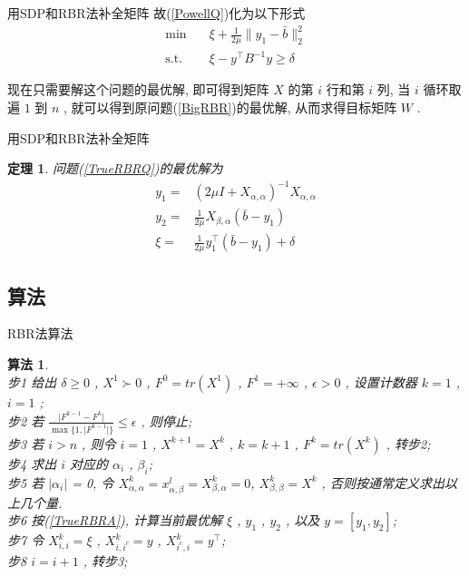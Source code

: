 \documentclass[slidestop, compress, mathserif, UTF8]{beamer}
\newtheorem{theo}{\bf \textcolor[rgb]{0.8,0,0}{定理}}[section]          %
\newtheorem{algo}{\bf \textcolor[rgb]{0.8,0,0}{算法}}
\numberwithin{equation}{section}                                        %
\begin{document}
			\begin{frame}[t]{用SDP和RBR法补全矩阵}
				故(\ref{PowellQ})化为以下形式
				\begin{equation}
					\begin{split}\label{TrueRBRQ}
						\min \quad
							& \xi + \frac{1}{2\mu} \lVert{y_1 - \bar{b}}\rVert^2_2\\
						\text{s.t.} \quad
							& \xi - y^\top B^{-1} y \geq \delta
					\end{split}
				\end{equation}

				现在只需要解这个问题的最优解, 即可得到矩阵 $X$ 的第 $i$ 行和第 $i$ 列, 当 $i$ 循环取遍 $1$ 到 $n$ , 就可以得到原问题(\ref{BigRBR})的最优解, 从而求得目标矩阵 $W$ .
			\end{frame}
			\begin{frame}[t]{用SDP和RBR法补全矩阵}
				\begin{theo}
					问题(\ref{TrueRBRQ})的最优解为
					\begin{equation}
						\begin{split}\label{TrueRBRA}
							y_1 = & (2 \mu I + X_{\alpha, \alpha})^{-1} X_{\alpha, \alpha}\\
							y_2 = & \frac{1}{2 \mu} X_{\beta, \alpha} (\bar{b} - y_1)\\
							\xi = & \frac{1}{2 \mu} y_1^\top (\bar{b} - y_1) + \delta
						\end{split}
					\end{equation}
				\end{theo}
			\end{frame}
		\subsection{算法}
			\begin{frame}[t]{RBR法算法}
				\begin{algo}
					\small\quad\\
					步1 \quad 给出 $\delta \ge 0$ , $X^1 \succ 0$ , $F^0 = tr(X^1)$ , $F^1 = + \infty$ , $\epsilon > 0$ , 设置计数器 $k = 1$ , $i = 1$ ;\\
					步2 \quad 若 $\frac{\lvert{F^{k - 1}-F^k}\rvert}{\max\{1,\lvert{F^{k - 1}}\rvert\}}\leq\epsilon$ , 则停止;\\
					步3 \quad 若 $i>n$ , 则令 $i=1$ , $X^{k + 1}=X^k$ , $k=k + 1$ , $F^k = tr(X^k)$ , 转步2;\\
					步4 \quad 求出 $i$ 对应的 $\alpha_i$ , $\beta_i$;\\
					步5 \quad 若 $\vert{\alpha_i}\vert$ = 0, 令 $X^k_{\alpha, \alpha} = x^l_{\alpha, \beta} = X^k_{\beta, \alpha} = 0$, $X^k_{\beta, \beta} = X^k$ , 否则按通常定义求出以上几个量.\\
					步6 \quad 按(\ref{TrueRBRA}), 计算当前最优解 $\xi$ , $y_1$ , $y_2$ , 以及 $y = [y_1, y_2]$;\\
					步7 \quad 令 $X^{k}_{i, i} = \xi$ , $X^{k}_{i, i^c} = y$ , $X^{k}_{i^c, i} = y^\top$;\\
					步8 \quad $i = i + 1$ , 转步3;\normalsize
				\end{algo}
			\end{frame}
	
\end{document}
